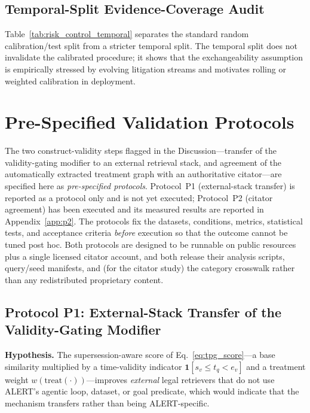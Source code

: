 \subsection{Temporal-Split Evidence-Coverage Audit}
\label{app:risk_control}
Table~\ref{tab:risk_control_temporal} separates the standard random calibration/test split from a stricter temporal split. The temporal split does not invalidate the calibrated procedure; it shows that the exchangeability assumption is empirically stressed by evolving litigation streams and motivates rolling or weighted calibration in deployment.



\section{Pre-Specified Validation Protocols}
\label{app:protocols}

The two construct-validity steps flagged in the Discussion---transfer of the validity-gating modifier to an external retrieval stack, and agreement of the automatically extracted treatment graph with an authoritative citator---are specified here as \emph{pre-specified protocols}. Protocol~P1 (external-stack transfer) is reported as a protocol only and is not yet executed; Protocol~P2 (citator agreement) has been executed and its measured results are reported in Appendix~\ref{app:p2}. The protocols fix the datasets, conditions, metrics, statistical tests, and acceptance criteria \emph{before} execution so that the outcome cannot be tuned post hoc. Both protocols are designed to be runnable on public resources plus a single licensed citator account, and both release their analysis scripts, query/seed manifests, and (for the citator study) the category crosswalk rather than any redistributed proprietary content.

\subsection{Protocol P1: External-Stack Transfer of the Validity-Gating Modifier}
\label{app:p1}

\textbf{Hypothesis.} The supersession-aware score of Eq.~\eqref{eq:tpg_score}---a base similarity multiplied by a time-validity indicator $\mathbf{1}[s_v\!\le\! t_q\!<\! e_v]$ and a treatment weight $w(\mathrm{treat}(\cdot))$---improves \emph{external} legal retrievers that do not use ALERT's agentic loop, dataset, or goal predicate, which would indicate that the mechanism transfers rather than being ALERT-specific.

